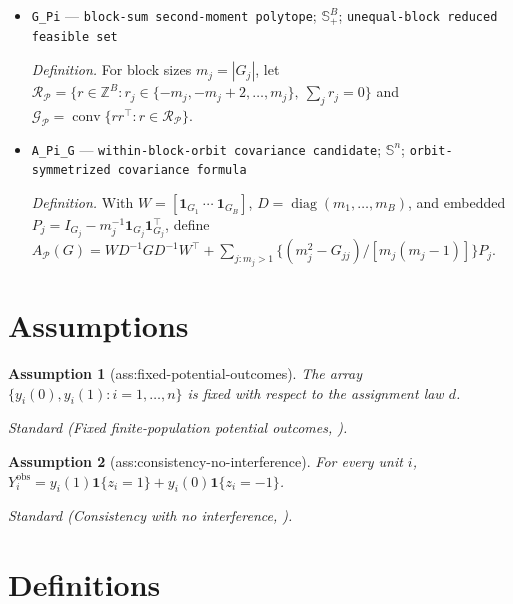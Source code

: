 \documentclass{article}
\newtheorem{assumption}{Assumption}
\begin{document}
\begin{itemize}
  \par\smallskip\noindent\emph{Definition.} \(S_4=\operatorname{span}\{u_4\}\), the \(n=4\) instance of \(S_{\mathrm{pair}}\).
  \item \texttt{G\_\allowbreak{}Pi} --- \texttt{block-\allowbreak{}sum second-\allowbreak{}moment polytope}; \(\mathbb S_+^B\); \texttt{unequal-\allowbreak{}block reduced feasible set}
  \par\smallskip\noindent\emph{Definition.} For block sizes \(m_j=|G_j|\), let \(\mathcal R_{\mathcal P}=\{r\in\mathbb Z^B:r_j\in\{-m_j,-m_j+2,\ldots,m_j\},\ \sum_jr_j=0\}\) and \(\mathcal G_{\mathcal P}=\operatorname{conv}\{rr^\top:r\in\mathcal R_{\mathcal P}\}\).
  \item \texttt{A\_\allowbreak{}Pi\_\allowbreak{}G} --- \texttt{within-\allowbreak{}block-\allowbreak{}orbit covariance candidate}; \(\mathbb S^n\); \texttt{orbit-\allowbreak{}symmetrized covariance formula}
  \par\smallskip\noindent\emph{Definition.} With \(W=[\mathbf 1_{G_1}\ \cdots\ \mathbf 1_{G_B}]\), \(D=\operatorname{diag}(m_1,\ldots,m_B)\), and embedded \(P_j=I_{G_j}-m_j^{-1}\mathbf 1_{G_j}\mathbf 1_{G_j}^\top\), define \(A_{\mathcal P}(G)=WD^{-1}GD^{-1}W^\top+\sum_{j:m_j>1}\{(m_j^2-G_{jj})/[m_j(m_j-1)]\}P_j\).
\end{itemize}

\section{Assumptions}

\begin{assumption}[ass:fixed-potential-outcomes]\label{ass:fixed-potential-outcomes}
The array \(\{y_i(0),y_i(1):i=1,\ldots,n\}\) is fixed with respect to the assignment law \(d\).
\par\smallskip\noindent\emph{Standard} (Fixed finite-population potential outcomes, \cite{HarshawSavjeSpielmanZhang2024}).
\end{assumption}

\begin{assumption}[ass:consistency-no-interference]\label{ass:consistency-no-interference}
For every unit \(i\), \(Y_i^{\mathrm{obs}}=y_i(1)\mathbf 1\{z_i=1\}+y_i(0)\mathbf 1\{z_i=-1\}\).
\par\smallskip\noindent\emph{Standard} (Consistency with no interference, \cite{HarshawSavjeSpielmanZhang2024}).
\end{assumption}

\section{Definitions}
\end{document}
